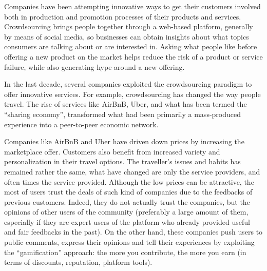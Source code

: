 Companies have been attempting innovative ways to get their customers involved both in production and promotion processes of their products and services. Crowdsourcing brings people together through a web-based platform, %
generally by means of social media, so businesses can obtain insights about what topics consumers are talking about or are interested in.
Asking what people like before offering a new product on the market helps reduce the risk of a product or service failure, while also generating hype around a new offering.

In the last decade, several companies exploited the crowdsourcing paradigm to offer innovative services. For example, crowdsourcing has changed the way people travel. The rise of services like AirBnB, Uber, and what has been termed the ``sharing economy'', transformed what had been primarily a mass-produced experience into a peer-to-peer economic network.

Companies like AirBnB and Uber have driven down prices by increasing the marketplace offer. Customers also benefit from increased variety and personalization in their travel options. 
The traveller’s issues and habits has remained rather the same, what have changed are only the service providers, and often times the service provided. %
Although the low prices can be attractive, the most of users trust the deals of such kind of companies due to the feedbacks of previous customers. Indeed, they do not actually trust the companies, but the opinions of other users of the community (preferably a large amount of them, especially if they are expert users of the platform who already provided useful and fair feedbacks in the past). On the other hand, these companies push users to public comments, express their opinions and tell their experiences by exploiting the ``gamification'' approach: the more you contribute, the more you earn (in terms of discounts, reputation, platform tools). 

